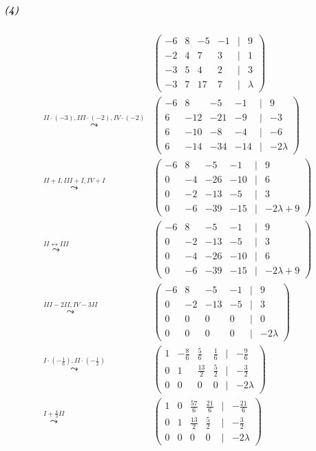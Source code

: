 \documentclass[a4paper,12pt]{article}
\begin{document}
\subparagraph{(4)}
\[
    \begin{aligned}
                                                               & \begin{pmatrix}-6&8&-5&-1&|&9\\-2&4&7&3&|&1\\-3&5&4&2&|&3\\-3&7&17&7&|&\lambda\end{pmatrix}                                 \\
        \overset{II\cdot(-3),III\cdot(-2),IV\cdot(-2)}\leadsto & \begin{pmatrix}-6&8&-5&-1&|&9\\6&-12&-21&-9&|&-3\\6&-10&-8&-4&|&-6\\6&-14&-34&-14&|&-2\lambda\end{pmatrix}                  \\
        \overset{II+I,III+I,IV+I}\leadsto                      & \begin{pmatrix}-6&8&-5&-1&|&9\\0&-4&-26&-10&|&6\\0&-2&-13&-5&|&3\\0&-6&-39&-15&|&-2\lambda+9\end{pmatrix}                   \\
        \overset{II\leftrightarrow III}\leadsto                & \begin{pmatrix}-6&8&-5&-1&|&9\\0&-2&-13&-5&|&3\\0&-4&-26&-10&|&6\\0&-6&-39&-15&|&-2\lambda+9\end{pmatrix}                   \\
        \overset{III-2II,IV-3II}\leadsto                       & \begin{pmatrix}-6&8&-5&-1&|&9\\0&-2&-13&-5&|&3\\0&0&0&0&|&0\\0&0&0&0&|&-2\lambda\end{pmatrix}                               \\
        \overset{I\cdot(-\frac16),II\cdot(-\frac12)}\leadsto   & \begin{pmatrix}1&-\frac86&\frac56&\frac16&|&-\frac96\\0&1&\frac{13}2&\frac52&|&-\frac32\\0&0&0&0&|&-2\lambda\end{pmatrix}   \\
        \overset{I+\frac43II}\leadsto                          & \begin{pmatrix}1&0&\frac{57}6&\frac{21}6&|&-\frac{21}6\\0&1&\frac{13}2&\frac52&|&-\frac32\\0&0&0&0&|&-2\lambda\end{pmatrix}
    \end{aligned}
\]
\end{document}
